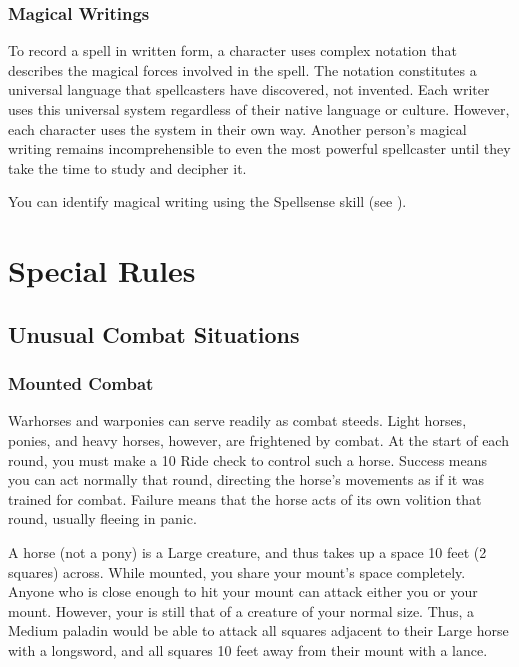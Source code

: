         \subsubsection{Magical Writings}
            To record a spell in written form, a character uses complex notation that describes the magical forces involved in the spell.
            The notation constitutes a universal language that spellcasters have discovered, not invented.
            Each writer uses this universal system regardless of their native language or culture.
            However, each character uses the system in their own way.
            Another person's magical writing remains incomprehensible to even the most powerful spellcaster until they take the time to study and decipher it.

            You can identify magical writing using the Spellsense skill (see ).

\section{Special Rules}

    \subsection{Unusual Combat Situations}

        \subsubsection{Mounted Combat}\label{Mounted Combat}
             Warhorses and warponies can serve readily as combat steeds. Light horses, ponies, and heavy horses, however, are frightened by combat.
            At the start of each round, you must make a  10 Ride check to control such a horse.
            Success means you can act normally that round, directing the horse's movements as if it was trained for combat.
            Failure means that the horse acts of its own volition that round, usually fleeing in panic.

             A horse (not a pony) is a Large creature, and thus takes up a space 10 feet (2 squares) across. While mounted, you share your mount's space completely. Anyone who is close enough to hit your mount can attack either you or your mount. However, your  is still that of a creature of your normal size. Thus, a Medium paladin would be able to attack all squares adjacent to their Large horse with a longsword, and all squares 10 feet away from their mount with a lance.

